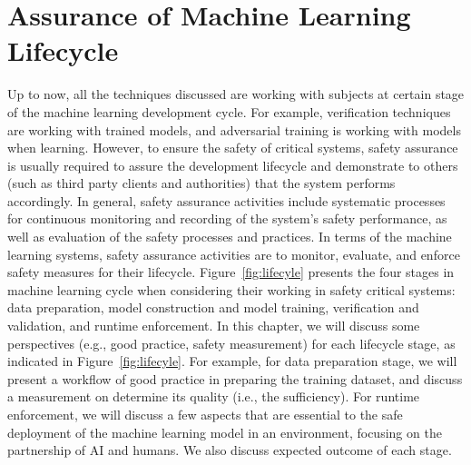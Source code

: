 





\chapter{Assurance of Machine Learning  Lifecycle}\label{chap:safetyassurance}

Up to now, all the techniques discussed are working with subjects at certain stage of the machine learning development cycle. For example, verification techniques are working with trained models, and adversarial training is working with models when learning. However, to ensure the safety of critical systems, safety assurance is usually required to assure the  development lifecycle and demonstrate to others (such as third party clients and authorities) that the  system performs accordingly. 
In general, safety assurance activities include  systematic processes for continuous monitoring and recording of the system's safety performance, as well as evaluation of the safety processes and practices. In terms of the machine learning systems, safety assurance activities are to monitor, evaluate, and enforce safety measures for their lifecycle. 
%
Figure~\ref{fig:lifecyle} presents the four stages in machine learning cycle when considering their working in safety critical systems: data preparation, model construction and model training, verification and validation, and runtime enforcement.
In this chapter, we will discuss some perspectives (e.g., good practice, safety measurement) for each lifecycle stage, as indicated in Figure~\ref{fig:lifecyle}. For example, for data preparation stage, we will present a workflow of good practice in preparing the training dataset, and discuss a measurement on determine its quality (i.e., the sufficiency). For runtime enforcement, we will discuss a few aspects that are essential to the safe deployment of the machine learning model in an environment, focusing on the partnership of AI and humans. We also discuss expected outcome of each stage. 


